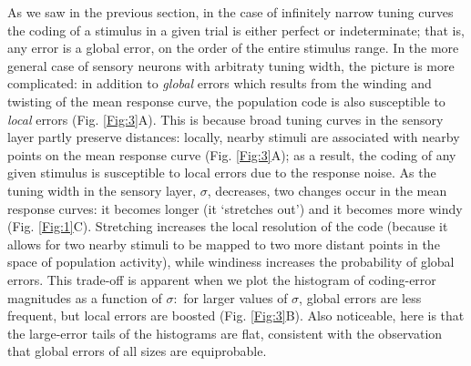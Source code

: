 \documentclass[a4paper]{article}%
\begin{document}
As we saw in the previous section, in the case of infinitely narrow tuning
curves the coding of a stimulus in a given trial is either perfect or
indeterminate; that is, any error is a global error, on the order of the
entire stimulus range. In the more general case of sensory neurons with
arbitraty tuning width, the picture is more complicated: in addition to
\textit{global} errors which results from the winding and twisting of the mean
response curve, the population code is also susceptible to \textit{local}
errors (Fig. \ref{Fig:3}A). This is because broad tuning curves in the sensory
layer partly preserve distances: locally, nearby stimuli are associated with
nearby points on the mean response curve (Fig. \ref{Fig:3}A); as a result, the
coding of any given stimulus is susceptible to local errors due to the
response noise. As the tuning width in the sensory layer, $\sigma$, decreases,
two changes occur in the mean response curves: it becomes longer (it
`stretches out') and it becomes more windy (Fig. \ref{Fig:1}C). Stretching
increases the local resolution of the code (because it allows for two nearby
stimuli to be mapped to two more distant points in the space of population
activity), while windiness increases the probability of global errors. This
trade-off is apparent when we plot the histogram of coding-error magnitudes as
a function of $\sigma$:\ for larger values of $\sigma$, global errors are less
frequent, but local errors are boosted (Fig. \ref{Fig:3}B). Also noticeable,
here is that the large-error tails of the histograms are flat, consistent with
the observation that global errors of all sizes are equiprobable.
\end{document}
